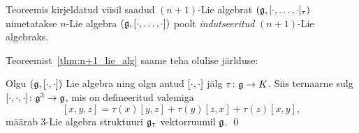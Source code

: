 
Teoreemis kirjeldatud viisil saadud $(n+1)$-Lie algebrat
$(\mathfrak{g}, [\cdot, \dots, \cdot]_\tau)$ nimetatakse $n$-Lie algebra
$(\mathfrak{g}, [\cdot, \dots, \cdot])$ poolt \emph{indutseeritud}
$(n+1)$-Lie algebraks.

Teoreemist~\ref{thm:n+1_lie_alg} saame teha olulise järlduse:

\begin{jar}
    Olgu $(\mathfrak{g}, \left[ \cdot, \cdot \right])$ Lie algebra ning olgu antud
    $\left[ \cdot, \cdot \right]$ jälg $\tau \colon \mathfrak{g} \to K$. Siis ternaarne sulg
    $[ \cdot, \cdot, \cdot ] \colon \mathfrak{g}^3 \to \mathfrak{g}$, mis on defineeritud
    valemiga
    \[
        [x, y, z] = \tau(x)[y, z] + \tau(y)[z, x] + \tau(z)[x, y],
    \]
    määrab $3$-Lie algebra struktuuri $\mathfrak{g}_\tau$ vektorruumil $\mathfrak{g}$.
    \hfill \qed
\end{jar}

